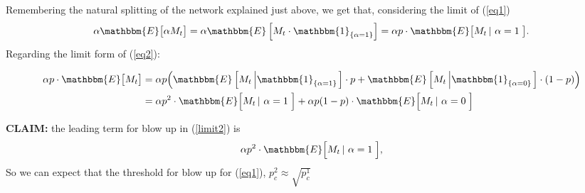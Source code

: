 \begin{remark}
Remembering the natural splitting of the network explained just above, we get that, considering the limit of (\ref{eq1}) \[ \alpha \mathbbm{E} \big[ \alpha M_t \big] = \alpha \mathbbm{E} \left[ M_t \cdot \mathbbm{1}_{ \left\{ \alpha = 1 \right\} } \right] = \alpha p \cdot \mathbbm{E} \big[ M_t \left| \ \alpha = 1 \right. \big]. \] Regarding the limit form of (\ref{eq2}): 

\begin{equation} \label{limit2} 
\begin{aligned} \alpha p \cdot \mathbbm{E} \big[ M_t \big] &= \alpha p \Big( \mathbbm{E} \left[ M_t \left| \mathbbm{1}_{ \left\{ \alpha = 1 \right\} } \right. \right] \cdot p  + \mathbbm{E} \left[ M_t \left| \mathbbm{1}_{ \left\{ \alpha = 0 \right\} } \right. \right] \cdot (1 - p) \Big) \\ & = \alpha p^2 \cdot \mathbbm{E} \Big[ M_t \left| \ \alpha = 1 \right. \Big] + \alpha p (1 - p) \cdot \mathbbm{E} \Big[ M_t \left| \ \alpha = 0 \right. \Big] 
\end{aligned} 
\end{equation}

\textbf{CLAIM:} the leading term for blow up in (\ref{limit2}) is 
\[ \alpha p^2 \cdot \mathbbm{E} \Big[ M_t \left| \ \alpha = 1 \right. \Big], \] 
So we can expect that the threshold for blow up for (\ref{eq1}), $p^2_c\approx \sqrt{p^1_c}$
\end{remark}
